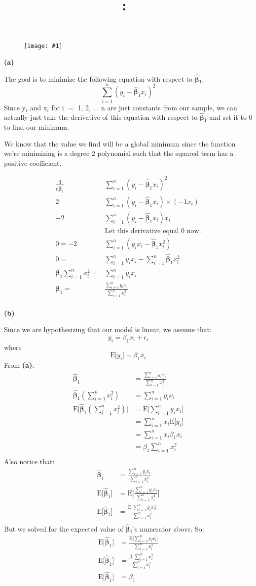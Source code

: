 \documentclass{article}
\title{
    \vspace{2in}
    \textmd{\textbf{\hmwkClass:\ \hmwkTitle}}\\
    \normalsize\vspace{0.1in}\small\vspace{0.1in}\large{\textit{\hmwkClassInstructor}}
    \vspace{3in}
}
\author{\hmwkAuthorName}
\date{}
\newcommand{\mt}[1]{\ensuremath{#1}}
\newcommand{\bpth}[1]{\textbf{(#1)}}
\newcommand{\bta}{\mt{\beta} }
\newcommand{\eql}{ \mt{\operatorname{=}} }
\newcommand{\uw}[2]{#1\mt{_{#2}}}
\newcommand{\eqn}[1]{\[#1\]}
\newcommand{\splt}[1]{\begin{split}#1\end{split}}
\newcommand{\txt}[1]{\text{#1}} %
\newcommand{\bh}[1]{\mathbf{\hat{\text{$#1$}}}}
\newcommand{\bth}{\mt{\bh{\beta}}}
\newcommand{\exv}[1]{\txt{E[}#1\txt{]}}
\newcommand{\wimg}[1]{
\begin{figure}[h]
  \texttt{[image: \#1]}
\end{figure}
}
\newcommand{\sumin}[1]{\mt{\sum_{i = 1}^n #1}}
\begin{document}
\wimg{THFP1}

\bpth{a}

The goal is to minimize the following equation with respect to \uw{\bth}{1}.
\eqn{\sumin{(y_i - \bth_1x_i)^2}}
Since \uw{y}{i} and \uw{x}{i} for i \eql 1, 2, ... n are just constants from our sample, we can actually just take the derivative of this equation with respect to \uw{\bth}{1} and set it to 0 to find our minimum.

We know that the value we find will be a global minimum since the function we're minimizing is a degree 2 polynomial such that the squared term has a positive coefficient.

\eqn{
	\splt{
		\frac{\mathrm{d}}{\mathrm{d}\bth_1} & \sumin{(y_i - \bth_1x_i)^2} \\
		2 & \sumin{(y_i - \bth_1x_i)} \times (-1x_i) \\
		-2 & \sumin{(y_i - \bth_1x_i)x_i} \\
		& \textrm{Let this derivative equal 0 now.} \\
		0 = -2 & \sumin{(y_ix_i - \bth_1x_i^2)} \\
		0 = & \sumin{y_ix_i} - \sumin{\bth_1x_i^2} \\
		\bth_1\sumin{x_i^2} = & \sumin{y_ix_i} \\
		\bth_1 = & \frac{\sumin{y_ix_i}}{\sumin{x_i^2}} \\}
}


\bpth{b}

Since we are hypothesizing that our model is linear, we assume that:
\eqn{y_i = \bta_1x_i + \epsilon_i}
where
\eqn{\exv{y_i} = \bta_1x_i}
From \bpth{a}:
\eqn{
	\splt{\bth_1 & = \frac{\sumin{y_ix_i}}{\sumin{x_i^2}} \\
	\bth_1(\sumin{x_i^2}) & = \sumin{y_ix_i} \\
	\exv{\bth_1(\sumin{x_i^2})} & = \exv{\sumin{y_ix_i}} \\
	& = \sumin{x_i \exv{y_i}} \\
	& = \sumin{x_i \bta_1x_i} \\
	& = \bta_1\sumin{x_i^2} \\}
}
Also notice that:
\eqn{
	\splt{\bth_1 & = \frac{\sumin{y_ix_i}}{\sumin{x_i^2}} \\
	\exv{\bth_1} & = \exv{\frac{\sumin{y_ix_i}}{\sumin{x_i^2}}} \\
	\exv{\bth_1} & = \frac{\exv{\sumin{y_ix_i}}}{\sumin{x_i^2}} \\}
}
But we solved for the expected value of \uw{\bth}{1}'s numerator above. So:
\eqn{
	\splt{\exv{\bth_1} & = \frac{\exv{\sumin{y_ix_i}}}{\sumin{x_i^2}} \\
	\exv{\bth_1} & = \frac{\bta_1\sumin{x_i^2}}{\sumin{x_i^2}} \\
	\exv{\bth_1} & = \bta_1 \\}
}
\newpage
\end{document}
